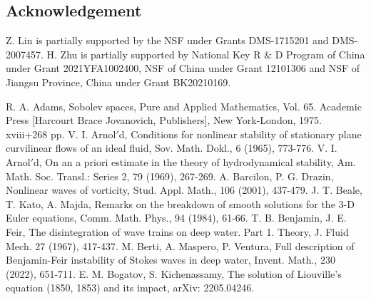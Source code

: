 \documentclass[1 [leqno, 11pt]{amsart}
\numberwithin{equation}{section}
\begin{document}
\begin{CJK*}{GBK}{song}
\section*{Acknowledgement}
Z. Lin is partially supported by  the NSF under  Grants DMS-1715201 and DMS-2007457. H. Zhu is  partially supported by National Key R $\&$ D Program of China under Grant 2021YFA1002400, NSF
of China under Grant 12101306 and NSF of Jiangsu Province, China under Grant BK20210169.


\begin{thebibliography}{99}
 R. A. Adams,  Sobolev spaces, Pure and Applied Mathematics, Vol. 65. Academic Press [Harcourt Brace Jovanovich, Publishers], New York-London, 1975. xviii+268 pp.
 V. I. Arnol$'$d,  Conditions for nonlinear stability of stationary plane curvilinear flows of an ideal
fluid, Sov. Math. Dokl., 6 (1965), 773-776.
  V. I. Arnol$'$d, On an a priori estimate in the theory of hydrodynamical stability, Am. Math. Soc.
Transl.: Series 2, 79 (1969), 267-269.
 A. Barcilon, P. G. Drazin,  Nonlinear waves of vorticity, Stud. Appl. Math., 106 (2001),  437-479.
  J. T. Beale, T. Kato, A. Majda,  Remarks on the breakdown of smooth solutions for the 3-D Euler equations, Comm. Math. Phys., 94 (1984),  61-66.
 T. B. Benjamin, J. E. Feir,  The disintegration of wave trains on deep water. Part 1.
Theory, J. Fluid Mech. 27 (1967), 417-437.
 M. Berti,  A. Maspero, P.  Ventura,  Full description of Benjamin-Feir instability of Stokes waves in deep water, Invent. Math., 230 (2022), 651-711.
 E. M. Bogatov, S. Kichenassamy, The solution of Liouville's equation (1850, 1853) and its impact, 	arXiv: 2205.04246.


\end{thebibliography}
\end{CJK*}
\end{document}

